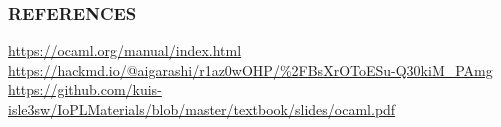 \documentclass[dvipdfmx,14pt,notheorems,aspectratio=169]{beamer}
\theoremstyle{definition}
\begin{document}
    \begin{frame}[allowframebreaks]\frametitle{\foekfamily REFERENCES}
        
        
        \begin{thebibliography}{99}
        \beamertemplatetextbibitems
         \url{https://ocaml.org/manual/index.html}
         \url{https://hackmd.io/@aigarashi/r1az0wOHP/\%2FBsXrOToESu-Q30kiM_PAmg}
         \url{https://github.com/kuis-isle3sw/IoPLMaterials/blob/master/textbook/slides/ocaml.pdf}
        \end{thebibliography}
    \end{frame}
\end{document}
